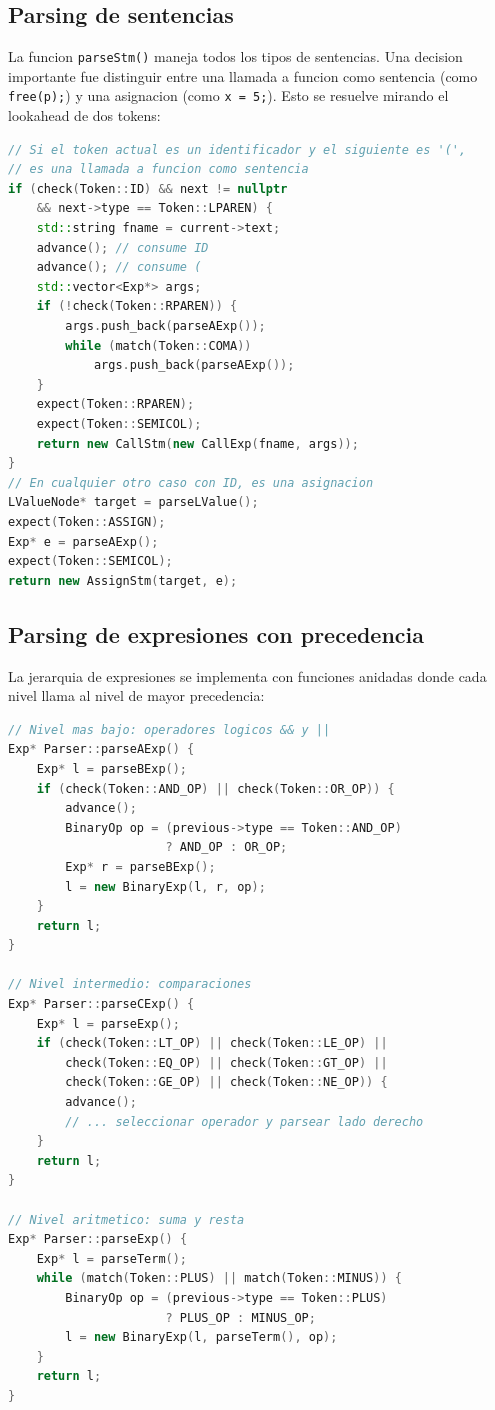 \documentclass[12pt, a4paper]{article}
\begin{document}
\subsection{Parsing de sentencias}

La funcion \texttt{parseStm()} maneja todos los tipos de sentencias. Una decision importante fue distinguir entre una llamada a funcion como sentencia (como \texttt{free(p);}) y una asignacion (como \texttt{x = 5;}). Esto se resuelve mirando el lookahead de dos tokens:

\begin{lstlisting}[language=C++, style=cppstyle, caption={Deteccion de CallStm vs AssignStm}]
// Si el token actual es un identificador y el siguiente es '(',
// es una llamada a funcion como sentencia
if (check(Token::ID) && next != nullptr
    && next->type == Token::LPAREN) {
    std::string fname = current->text;
    advance(); // consume ID
    advance(); // consume (
    std::vector<Exp*> args;
    if (!check(Token::RPAREN)) {
        args.push_back(parseAExp());
        while (match(Token::COMA))
            args.push_back(parseAExp());
    }
    expect(Token::RPAREN);
    expect(Token::SEMICOL);
    return new CallStm(new CallExp(fname, args));
}
// En cualquier otro caso con ID, es una asignacion
LValueNode* target = parseLValue();
expect(Token::ASSIGN);
Exp* e = parseAExp();
expect(Token::SEMICOL);
return new AssignStm(target, e);
\end{lstlisting}

\subsection{Parsing de expresiones con precedencia}

La jerarquia de expresiones se implementa con funciones anidadas donde cada nivel llama al nivel de mayor precedencia:

\begin{lstlisting}[language=C++, style=cppstyle, caption={Jerarquia de expresiones}]
// Nivel mas bajo: operadores logicos && y ||
Exp* Parser::parseAExp() {
    Exp* l = parseBExp();
    if (check(Token::AND_OP) || check(Token::OR_OP)) {
        advance();
        BinaryOp op = (previous->type == Token::AND_OP)
                      ? AND_OP : OR_OP;
        Exp* r = parseBExp();
        l = new BinaryExp(l, r, op);
    }
    return l;
}

// Nivel intermedio: comparaciones
Exp* Parser::parseCExp() {
    Exp* l = parseExp();
    if (check(Token::LT_OP) || check(Token::LE_OP) ||
        check(Token::EQ_OP) || check(Token::GT_OP) ||
        check(Token::GE_OP) || check(Token::NE_OP)) {
        advance();
        // ... seleccionar operador y parsear lado derecho
    }
    return l;
}

// Nivel aritmetico: suma y resta
Exp* Parser::parseExp() {
    Exp* l = parseTerm();
    while (match(Token::PLUS) || match(Token::MINUS)) {
        BinaryOp op = (previous->type == Token::PLUS)
                      ? PLUS_OP : MINUS_OP;
        l = new BinaryExp(l, parseTerm(), op);
    }
    return l;
}
\end{lstlisting}
\end{document}
